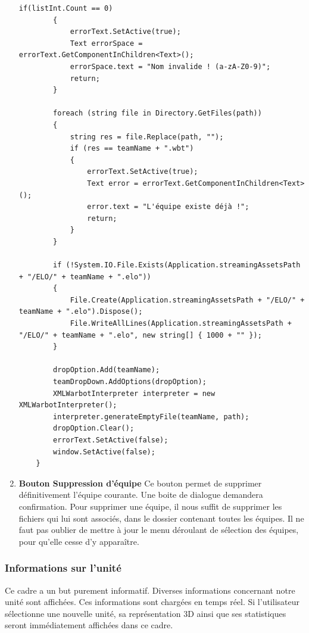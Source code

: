 \documentclass{report}
\begin{document}
\begin{enumerate}[label=\Alph*)]
\begin{lstlisting}[language={[Sharp]C},label={lst:validateName()}, caption= Extrait du code de CreateTeam.cs]
        if(listInt.Count == 0)
        {
            errorText.SetActive(true);
            Text errorSpace = errorText.GetComponentInChildren<Text>();
            errorSpace.text = "Nom invalide ! (a-zA-Z0-9)";
            return;
        }

        foreach (string file in Directory.GetFiles(path))
        {
            string res = file.Replace(path, "");
            if (res == teamName + ".wbt")
            {
                errorText.SetActive(true);
                Text error = errorText.GetComponentInChildren<Text>();
                error.text = "L'équipe existe déjà !";
                return;
            }
        }

        if (!System.IO.File.Exists(Application.streamingAssetsPath + "/ELO/" + teamName + ".elo"))
        {
            File.Create(Application.streamingAssetsPath + "/ELO/" + teamName + ".elo").Dispose();
            File.WriteAllLines(Application.streamingAssetsPath + "/ELO/" + teamName + ".elo", new string[] { 1000 + "" });
        }

        dropOption.Add(teamName);
        teamDropDown.AddOptions(dropOption);
        XMLWarbotInterpreter interpreter = new XMLWarbotInterpreter();
        interpreter.generateEmptyFile(teamName, path);
        dropOption.Clear();
        errorText.SetActive(false);
        window.SetActive(false);
    }
\end{lstlisting}	

\item\textbf{Bouton Suppression d'équipe} \newline
Ce bouton permet de supprimer définitivement l'équipe courante. Une boite de dialogue demandera confirmation.
Pour supprimer une équipe, il nous suffit de supprimer les fichiers qui lui sont associés, dans le dossier contenant toutes les équipes. Il ne faut pas oublier de mettre à jour le menu déroulant de sélection des équipes, pour qu'elle cesse d'y apparaître.
\end{enumerate}


\subsubsection{Informations sur l'unité}
Ce cadre a un but purement informatif. Diverses informations concernant notre unité sont affichées. Ces informations sont chargées en temps réel.\newline
Si l'utilisateur sélectionne une nouvelle unité, sa représentation 3D ainsi que ses statistiques seront immédiatement affichées dans ce cadre.
\end{document}
